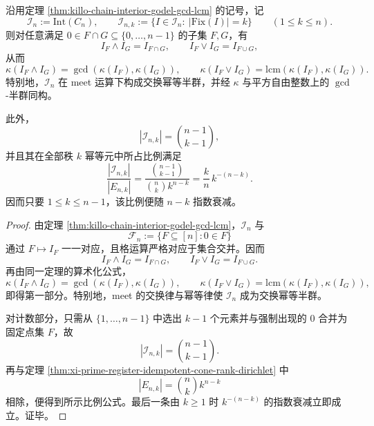 \begin{theorem}\label{thm:xi-monotone-idempotent-skeleton-gcd-lcm-sparsity}
沿用定理 \ref{thm:killo-chain-interior-godel-gcd-lcm} 的记号，记
\[
\mathcal I_n:=\mathrm{Int}(C_n),
\qquad
\mathcal I_{n,k}:=\{I\in\mathcal I_n:\ |\mathrm{Fix}(I)|=k\}
\qquad(1\le k\le n).
\]
则对任意满足 \(0\in F\cap G\subseteq\{0,\dots,n-1\}\) 的子集 \(F,G\)，有
\[
I_F\wedge I_G=I_{F\cap G},
\qquad
I_F\vee I_G=I_{F\cup G},
\]
从而
\[
\kappa(I_F\wedge I_G)=\gcd(\kappa(I_F),\kappa(I_G)),
\qquad
\kappa(I_F\vee I_G)=\mathrm{lcm}(\kappa(I_F),\kappa(I_G)).
\]
特别地，\(\mathcal I_n\) 在 meet 运算下构成交换幂等半群，并经 \(\kappa\) 与平方自由整数上的 \(\gcd\)-半群同构。

此外，
\[
|\mathcal I_{n,k}|=\binom{n-1}{k-1},
\]
并且其在全部秩 \(k\) 幂等元中所占比例满足
\[
\frac{|\mathcal I_{n,k}|}{|E_{n,k}|}
=
\frac{\binom{n-1}{k-1}}{\binom{n}{k}k^{n-k}}
=
\frac{k}{n}\,k^{-(n-k)}.
\]
因而只要 \(1\le k\le n-1\)，该比例便随 \(n-k\) 指数衰减。
\end{theorem}
\begin{proof}
由定理 \ref{thm:killo-chain-interior-godel-gcd-lcm}，\(\mathcal I_n\) 与
\[
\mathcal F_n:=\{F\subseteq[n]:0\in F\}
\]
通过 \(F\mapsto I_F\) 一一对应，且格运算严格对应于集合交并。因而
\[
I_F\wedge I_G=I_{F\cap G},
\qquad
I_F\vee I_G=I_{F\cup G}.
\]
再由同一定理的算术化公式，
\[
\kappa(I_F\wedge I_G)=\gcd(\kappa(I_F),\kappa(I_G)),
\qquad
\kappa(I_F\vee I_G)=\mathrm{lcm}(\kappa(I_F),\kappa(I_G)),
\]
即得第一部分。特别地，meet 的交换律与幂等律使 \(\mathcal I_n\) 成为交换幂等半群。

对计数部分，只需从 \(\{1,\dots,n-1\}\) 中选出 \(k-1\) 个元素并与强制出现的 \(0\) 合并为固定点集 \(F\)，故
\[
|\mathcal I_{n,k}|=\binom{n-1}{k-1}.
\]
再与定理 \ref{thm:xi-prime-register-idempotent-cone-rank-dirichlet} 中
\[
|E_{n,k}|=\binom{n}{k}k^{n-k}
\]
相除，便得到所示比例公式。最后一条由 \(k\ge 1\) 时 \(k^{-(n-k)}\) 的指数衰减立即成立。证毕。
\end{proof}

